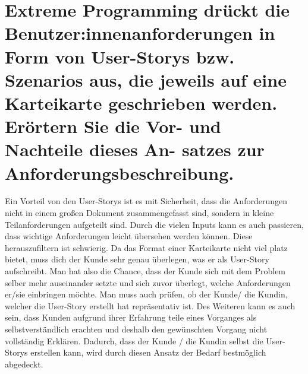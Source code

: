 \documentclass[12pt]{article}
\begin{document}
\section{Extreme Programming drückt die Benutzer:innenanforderungen in Form von User-Storys bzw. Szenarios
aus, die jeweils auf eine Karteikarte geschrieben werden. Erörtern Sie die Vor- und Nachteile dieses An-
satzes zur Anforderungsbeschreibung.}
Ein Vorteil von den User-Storys ist es mit Sicherheit, dass die Anforderungen nicht in einem großen Dokument zusammengefasst sind, sondern in kleine Teilanforderungen aufgeteilt sind. Durch die vielen Inputs kann es auch passieren, dass wichtige Anforderungen leicht übersehen werden können. Diese herauszufiltern ist schwierig.
Da das Format einer Karteikarte nicht viel platz bietet, muss dich der Kunde sehr genau überlegen, was er als User-Story aufschreibt. Man hat also die Chance, dass der Kunde sich mit dem Problem selber mehr auseinander setzte und sich zuvor überlegt, welche Anforderungen er/sie einbringen möchte. Man muss auch prüfen, ob der Kunde/ die Kundin, welcher die User-Story erstellt hat repräsentativ ist. Des Weiteren kann es auch sein, dass Kunden aufgrund ihrer Erfahrung teile eines Vorganges als selbstverständlich erachten und deshalb den gewünschten Vorgang nicht vollständig Erklären. Dadurch, dass der Kunde / die Kundin selbst die User-Storys erstellen kann, wird durch diesen Ansatz der Bedarf bestmöglich abgedeckt.
\end{document}
